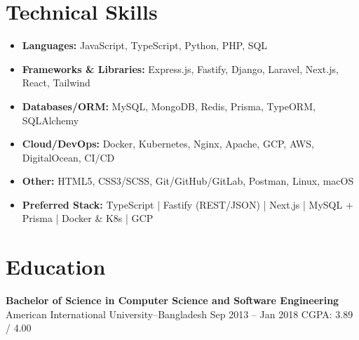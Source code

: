 \documentclass[a4paper,10pt]{article}
\begin{document}
\section*{Technical Skills}
\begin{itemize}[leftmargin=12pt]
  \item \textbf{Languages:} JavaScript, TypeScript, Python, PHP, SQL
  \item \textbf{Frameworks \& Libraries:} Express.js, Fastify, Django, Laravel, Next.js, React, Tailwind
  \item \textbf{Databases/ORM:} MySQL, MongoDB, Redis, Prisma, TypeORM, SQLAlchemy
  \item \textbf{Cloud/DevOps:} Docker, Kubernetes, Nginx, Apache, GCP, AWS, DigitalOcean, CI/CD
  \item \textbf{Other:} HTML5, CSS3/SCSS, Git/GitHub/GitLab, Postman, Linux, macOS
  \item \textbf{Preferred Stack:} TypeScript | Fastify (REST/JSON) | Next.js | MySQL + Prisma | Docker \& K8s | GCP
\end{itemize}

\section*{Education}
\textbf{Bachelor of Science in Computer Science and Software Engineering}\\
American International University--Bangladesh \hfill Sep 2013 -- Jan 2018 \hspace{1em} CGPA: 3.89 / 4.00
\end{document}
